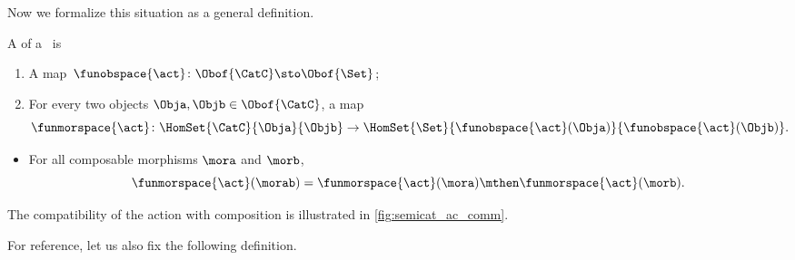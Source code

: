 Now we formalize this situation as a general definition.

\begin{ctdefinition}
    \label{def:semicategory-action}
    A  of a ~\CatC is

    \constit
    \begin{enumerate}
        \item A map~$\funobspace{\act} \colon \Obof{\CatC} \sto \Obof{\Set}$;
        \item For every two objects $\Obja, \Objb \in \Obof{\CatC}$, a map
              \begin{equation}
                  \funmorspace{\act} \colon \HomSet{\CatC}{\Obja}{\Objb} \to \HomSet{\Set}{ \funobspace{\act}(\Obja)}{\funobspace{\act}(\Objb)}.
              \end{equation}
    \end{enumerate}

    \condit

    \begin{itemize}
        \item For all composable morphisms $\mora$ and $\morb$,
              \begin{equation}
                  \funmorspace{\act}(\morab) = \funmorspace{\act}(\mora) \mthen \funmorspace{\act}(\morb).
              \end{equation}
    \end{itemize}
\end{ctdefinition}

The compatibility of the action with composition is illustrated in \cref{fig:semicat_ac_comm}.

\begin{marginfigure}
    \centering
    \caption{}
    \label{fig:semicat_ac_comm}
\end{marginfigure}

For reference, let us also fix the following definition.

